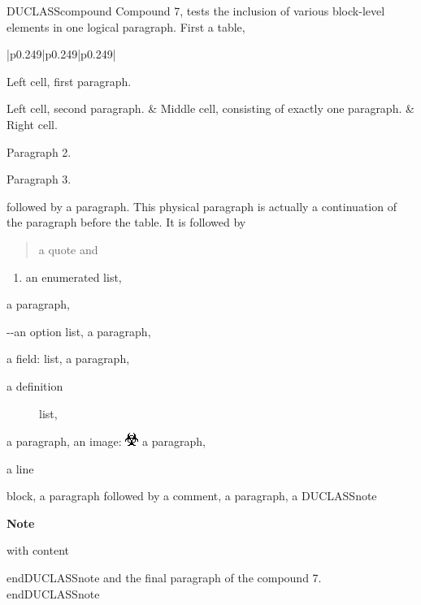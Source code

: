 \documentclass[a4paper]{article}
\newlength{\DUtablewidth} %
\newenvironment{DUclass}[1]%
    {%
     \def\DocutilsClassFunctionName{DUCLASS#1}
     \csname \DocutilsClassFunctionName \endcsname}%
    {\csname end\DocutilsClassFunctionName \endcsname}%
\newenvironment{DUadmonition}%
    {\begin{center}
       \begin{lrbox}{\DUadmonitionbox}
         \begin{minipage}{0.9\linewidth}
    }%
    {    \end{minipage}
       \end{lrbox}
       \fbox{\usebox{\DUadmonitionbox}}
     \end{center}
    }
\newenvironment{DUfieldlist}%
    {\quote\description}
    {\enddescription\endquote}
\newenvironment{DUlineblock}[1]{%
    \list{}{\setlength{\partopsep}{\parskip}
            \addtolength{\partopsep}{\baselineskip}
            \setlength{\topsep}{0pt}
            \setlength{\itemsep}{0.15\baselineskip}
            \setlength{\parsep}{0pt}
            \setlength{\leftmargin}{#1}}
    \raggedright
  }
  {\endlist}
\providecommand*{\DUoptionlistlabel}[1]{\bfseries #1 \hfill}
\newenvironment{DUoptionlist}{%
    \list{}{\setlength{\labelwidth}{\DUoptionlistindent}
            \setlength{\rightmargin}{1cm}
            \setlength{\leftmargin}{\rightmargin}
            \addtolength{\leftmargin}{\labelwidth}
            \addtolength{\leftmargin}{\labelsep}
            \renewcommand{\makelabel}{\DUoptionlistlabel}}
  }
  {\endlist}
\providecommand*{\DUtitle}[1]{%
  \smallskip\noindent\textbf{#1}\smallskip}
\begin{document}
\begin{DUclass}{compound}
Compound 7, tests the inclusion of various block-level
elements in one logical paragraph. First a table,
\setlength{\DUtablewidth}{\linewidth}%
\begin{longtable*}{|p{0.249\DUtablewidth}|p{0.249\DUtablewidth}|p{0.249\DUtablewidth}|}
\hline

Left cell, first
paragraph.

Left cell, second
paragraph.
 & 
Middle cell,
consisting of
exactly one
paragraph.
 & 
Right cell.

Paragraph 2.

Paragraph 3.
 \\
\hline
\end{longtable*}
followed by a paragraph. This physical paragraph is
actually a continuation of the paragraph before the table. It is followed
by
\begin{quote}
a quote and
\end{quote}
\begin{enumerate}
\item an enumerated list,
\end{enumerate}
a paragraph,
\begin{DUoptionlist}
\item[-{}-an]  option list,
\end{DUoptionlist}
a paragraph,
\begin{DUfieldlist}
\item[{a field:}]
list,
\end{DUfieldlist}
a paragraph,
\begin{description}
\item[{a definition}] 
list,
\end{description}
a paragraph, an image:
\includegraphics{../../../docs/user/rst/images/biohazard.png}
a paragraph,
\begin{DUlineblock}{0em}
\item[] a line
\item[] block,
\end{DUlineblock}
a paragraph followed by a comment,
a paragraph, a
\begin{DUclass}{note}
\begin{DUadmonition}
\DUtitle{Note}

with content
\end{DUadmonition}
\end{DUclass}
and the final paragraph of the compound 7.
\end{DUclass}
\end{document}
